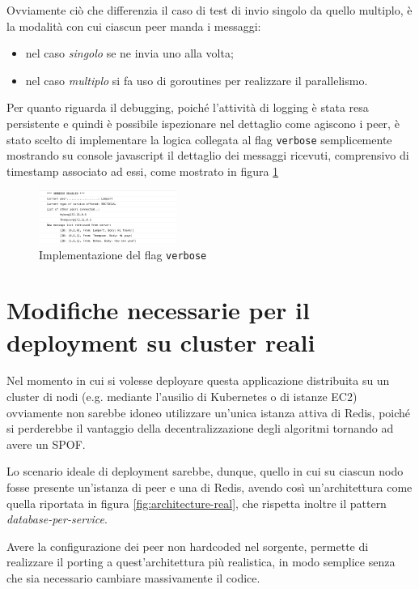 \documentclass[conference]{IEEEtran}
\begin{document}
Ovviamente ciò che differenzia il caso di test di invio singolo da quello multiplo, è la modalità con cui ciascun peer manda i messaggi:
\begin{itemize}
\item nel caso \textsl{singolo} se ne invia uno alla volta;
\item nel caso \textsl{multiplo} si fa uso di goroutines per realizzare il parallelismo.
\end{itemize}

Per quanto riguarda il debugging, poiché l'attività di logging è stata resa persistente e quindi è possibile ispezionare nel dettaglio come agiscono i peer, è stato scelto di implementare la logica collegata al flag \texttt{verbose} semplicemente mostrando su console javascript il dettaglio dei messaggi ricevuti, comprensivo di timestamp associato ad essi, come mostrato in figura \ref{fig:debug}

\begin{figure}[htbp]
\centerline{\includegraphics[width=0.4\textwidth]{figs/debug.png}}
\caption{Implementazione del flag \texttt{verbose}}
\label{fig:debug}
\end{figure}

\section{Modifiche necessarie per il deployment su cluster reali}
Nel momento in cui si volesse deployare questa applicazione distribuita su un cluster di nodi (e.g. mediante l'ausilio di Kubernetes o di istanze EC2) ovviamente non sarebbe idoneo utilizzare un'unica istanza attiva di Redis, poiché si perderebbe il vantaggio della decentralizzazione degli algoritmi tornando ad avere un SPOF.

Lo scenario ideale di deployment sarebbe, dunque, quello in cui su ciascun nodo fosse presente un'istanza di peer e una di Redis, avendo così un'architettura come quella riportata in figura \ref{fig:architecture-real}, che rispetta inoltre il pattern \textit{database-per-service}.

Avere la configurazione dei peer non hardcoded nel sorgente, permette di realizzare il porting a quest'architettura più realistica, in modo semplice senza che sia necessario cambiare massivamente il codice.
\end{document}
